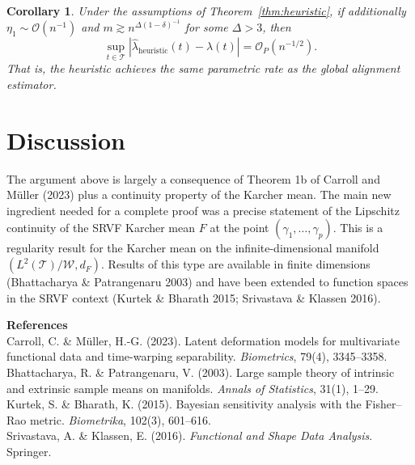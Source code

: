 \documentclass[11pt]{article}
\newtheorem{corollary}[theorem]{Corollary}
\theoremstyle{definition}
\newcommand{\T}{\mathcal{T}}
\newcommand{\W}{\mathcal{W}}
\newcommand{\lhat}{\hat{\lambda}}
\newcommand{\Op}{\mathcal{O}_P}
\newcommand{\sups}{\sup_{t \in \T}}
\begin{document}
\begin{corollary}
  Under the assumptions of Theorem~\ref{thm:heuristic}, if additionally
  $\eta_1 \sim \mathcal{O}(n^{-1})$ and $m \gtrsim n^{\Delta(1-\delta)^{-1}}$
  for some $\Delta > 3$, then
  \[
    \sups |\lhat_{\mathrm{heuristic}}(t) - \lambda(t)| = \Op(n^{-1/2}).
  \]
  That is, the heuristic achieves the same parametric rate as the global
  alignment estimator.
\end{corollary}

\section*{Discussion}

The argument above is largely a consequence of Theorem 1b of Carroll and M\"uller (2023) plus
a continuity property of the Karcher mean. The main new ingredient
needed for a complete proof was a precise statement of the Lipschitz continuity of the SRVF Karcher mean $F$ at the point
    $(\gamma_1,\ldots,\gamma_p)$. This is a regularity result for the Karcher
    mean on the infinite-dimensional manifold $(L^2(\T)/\W, d_F)$.
    Results of this type are available in finite dimensions
    (Bhattacharya \& Patrangenaru 2003) and have been extended to function
    spaces in the SRVF context (Kurtek \& Bharath 2015; Srivastava \& Klassen
    2016).


\bigskip
\noindent\textbf{References}\\[4pt]
Carroll, C. \& M\"{u}ller, H.-G. (2023). Latent deformation models for
multivariate functional data and time-warping separability.
\textit{Biometrics}, 79(4), 3345--3358.\\[4pt]
Bhattacharya, R. \& Patrangenaru, V. (2003). Large sample theory of intrinsic
and extrinsic sample means on manifolds.
\textit{Annals of Statistics}, 31(1), 1--29.\\[4pt]
Kurtek, S. \& Bharath, K. (2015). Bayesian sensitivity analysis with the
Fisher--Rao metric. \textit{Biometrika}, 102(3), 601--616.\\[4pt]
Srivastava, A. \& Klassen, E. (2016). \textit{Functional and Shape Data
Analysis}. Springer.
\end{document}

